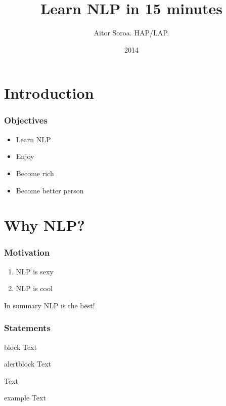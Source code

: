 \documentclass{beamer}
\title{Learn NLP in 15 minutes}
\author{Aitor Soroa. HAP/LAP.}
\date{2014}
\begin{document}
\begin{frame}[plain]
  \titlepage
\end{frame}

\begin{frame}
  \tableofcontents
\end{frame}

\section{Introduction}
\label{sec:introduction}

\begin{frame}
  \frametitle{Objectives}
  \begin{itemize}
  \item Learn NLP
  \item Enjoy
  \item Become rich
  \item Become better person
  \end{itemize}
\end{frame}

\section{Why NLP?}
\label{sec:why-nlp}

\begin{frame}
  \frametitle{Motivation}
  \begin{enumerate}
  \item NLP is sexy
  \item NLP is cool
  \end{enumerate}
  \begin{block}{In summary}
    NLP is the best!
  \end{block}
\end{frame}

\begin{frame}
	\frametitle{Statements}
	\begin{block}{block}
	Text
	\end{block}
	
	\begin{alertblock}{alertblock}
		Text
	\end{alertblock}
	
	\begin{definition}
		Text
	\end{definition}
	
	\begin{example}{example}
		Text
	\end{example}
\end{frame}
\end{document}
